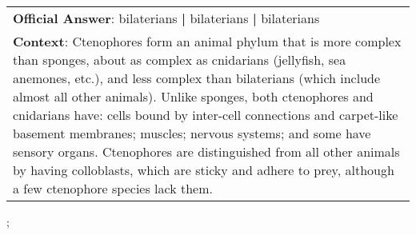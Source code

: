 \begin{figure*}[ht]
{\begin{tabular}{p{}}
            \textbf{Official Answer}: bilaterians \textbf{|} bilaterians \textbf{|} bilaterians                                                                                                                                                                                                                                                                                                                                                                                                                                                                                                      \\
            \textbf{Context}: Ctenophores form an animal phylum that is more complex than sponges, about as complex as cnidarians (jellyfish, sea anemones, etc.), and less complex than bilaterians (which include almost all other animals). Unlike sponges, both ctenophores and cnidarians have: cells bound by inter-cell connections and carpet-like basement membranes; muscles; nervous systems; and some have sensory organs. Ctenophores are distinguished from all other animals by having colloblasts, which are sticky and adhere to prey, although a few ctenophore species lack them. \\
        \end{tabular}
    };
    \label{fig:ex-5725cb33271a42140099d1dd}
\end{figure*}

